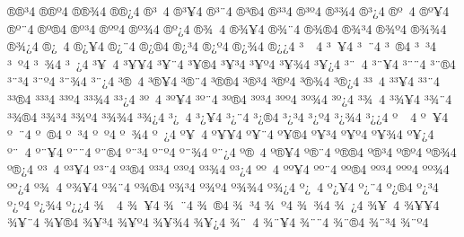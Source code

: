 {^^ae^^ae^^b34
^^ae^^ae^^ba4
^^ae^^ae^^be4
^^ae^^ae^^bf4
^^ae^^b3^^a04
^^ae^^b3^^a54
^^ae^^b3^^a84
^^ae^^b3^^ae4
^^ae^^b3^^b34
^^ae^^b3^^ba4
^^ae^^b3^^be4
^^ae^^b3^^bf4
^^ae^^ba^^a04
^^ae^^ba^^a54
^^ae^^ba^^a84
^^ae^^ba^^ae4
^^ae^^ba^^b34
^^ae^^ba^^ba4
^^ae^^ba^^be4
^^ae^^ba^^bf4
^^ae^^be^^a04
^^ae^^be^^a54
^^ae^^be^^a84
^^ae^^be^^ae4
^^ae^^be^^b34
^^ae^^be^^ba4
^^ae^^be^^be4
^^ae^^be^^bf4
^^ae^^bf^^a04
^^ae^^bf^^a54
^^ae^^bf^^a84
^^ae^^bf^^ae4
^^ae^^bf^^b34
^^ae^^bf^^ba4
^^ae^^bf^^be4
^^ae^^bf^^bf4
^^b3^^a0^^a04
^^b3^^a0^^a54
^^b3^^a0^^a84
^^b3^^a0^^ae4
^^b3^^a0^^b34
^^b3^^a0^^ba4
^^b3^^a0^^be4
^^b3^^a0^^bf4
^^b3^^a5^^a04
^^b3^^a5^^a54
^^b3^^a5^^a84
^^b3^^a5^^ae4
^^b3^^a5^^b34
^^b3^^a5^^ba4
^^b3^^a5^^be4
^^b3^^a5^^bf4
^^b3^^a8^^a04
^^b3^^a8^^a54
^^b3^^a8^^a84
^^b3^^a8^^ae4
^^b3^^a8^^b34
^^b3^^a8^^ba4
^^b3^^a8^^be4
^^b3^^a8^^bf4
^^b3^^ae^^a04
^^b3^^ae^^a54
^^b3^^ae^^a84
^^b3^^ae^^ae4
^^b3^^ae^^b34
^^b3^^ae^^ba4
^^b3^^ae^^be4
^^b3^^ae^^bf4
^^b3^^b3^^a04
^^b3^^b3^^a54
^^b3^^b3^^a84
^^b3^^b3^^ae4
^^b3^^b3^^b34
^^b3^^b3^^ba4
^^b3^^b3^^be4
^^b3^^b3^^bf4
^^b3^^ba^^a04
^^b3^^ba^^a54
^^b3^^ba^^a84
^^b3^^ba^^ae4
^^b3^^ba^^b34
^^b3^^ba^^ba4
^^b3^^ba^^be4
^^b3^^ba^^bf4
^^b3^^be^^a04
^^b3^^be^^a54
^^b3^^be^^a84
^^b3^^be^^ae4
^^b3^^be^^b34
^^b3^^be^^ba4
^^b3^^be^^be4
^^b3^^be^^bf4
^^b3^^bf^^a04
^^b3^^bf^^a54
^^b3^^bf^^a84
^^b3^^bf^^ae4
^^b3^^bf^^b34
^^b3^^bf^^ba4
^^b3^^bf^^be4
^^b3^^bf^^bf4
^^ba^^a0^^a04
^^ba^^a0^^a54
^^ba^^a0^^a84
^^ba^^a0^^ae4
^^ba^^a0^^b34
^^ba^^a0^^ba4
^^ba^^a0^^be4
^^ba^^a0^^bf4
^^ba^^a5^^a04
^^ba^^a5^^a54
^^ba^^a5^^a84
^^ba^^a5^^ae4
^^ba^^a5^^b34
^^ba^^a5^^ba4
^^ba^^a5^^be4
^^ba^^a5^^bf4
^^ba^^a8^^a04
^^ba^^a8^^a54
^^ba^^a8^^a84
^^ba^^a8^^ae4
^^ba^^a8^^b34
^^ba^^a8^^ba4
^^ba^^a8^^be4
^^ba^^a8^^bf4
^^ba^^ae^^a04
^^ba^^ae^^a54
^^ba^^ae^^a84
^^ba^^ae^^ae4
^^ba^^ae^^b34
^^ba^^ae^^ba4
^^ba^^ae^^be4
^^ba^^ae^^bf4
^^ba^^b3^^a04
^^ba^^b3^^a54
^^ba^^b3^^a84
^^ba^^b3^^ae4
^^ba^^b3^^b34
^^ba^^b3^^ba4
^^ba^^b3^^be4
^^ba^^b3^^bf4
^^ba^^ba^^a04
^^ba^^ba^^a54
^^ba^^ba^^a84
^^ba^^ba^^ae4
^^ba^^ba^^b34
^^ba^^ba^^ba4
^^ba^^ba^^be4
^^ba^^ba^^bf4
^^ba^^be^^a04
^^ba^^be^^a54
^^ba^^be^^a84
^^ba^^be^^ae4
^^ba^^be^^b34
^^ba^^be^^ba4
^^ba^^be^^be4
^^ba^^be^^bf4
^^ba^^bf^^a04
^^ba^^bf^^a54
^^ba^^bf^^a84
^^ba^^bf^^ae4
^^ba^^bf^^b34
^^ba^^bf^^ba4
^^ba^^bf^^be4
^^ba^^bf^^bf4
^^be^^a0^^a04
^^be^^a0^^a54
^^be^^a0^^a84
^^be^^a0^^ae4
^^be^^a0^^b34
^^be^^a0^^ba4
^^be^^a0^^be4
^^be^^a0^^bf4
^^be^^a5^^a04
^^be^^a5^^a54
^^be^^a5^^a84
^^be^^a5^^ae4
^^be^^a5^^b34
^^be^^a5^^ba4
^^be^^a5^^be4
^^be^^a5^^bf4
^^be^^a8^^a04
^^be^^a8^^a54
^^be^^a8^^a84
^^be^^a8^^ae4
^^be^^a8^^b34
^^be^^a8^^ba4
}
